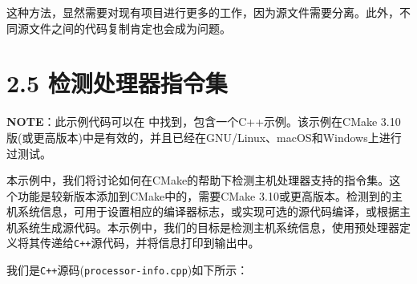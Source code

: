 这种方法，显然需要对现有项目进行更多的工作，因为源文件需要分离。此外，不同源文件之间的代码复制肯定也会成为问题。


\section{2.5 检测处理器指令集}

\begin{myInfoBox}
\textbf{NOTE}：此示例代码可以在  中找到，包含一个C++示例。该示例在CMake 3.10版(或更高版本)中是有效的，并且已经在GNU/Linux、macOS和Windows上进行过测试。
\end{myInfoBox}

本示例中，我们将讨论如何在CMake的帮助下检测主机处理器支持的指令集。这个功能是较新版本添加到CMake中的，需要CMake 3.10或更高版本。检测到的主机系统信息，可用于设置相应的编译器标志，或实现可选的源代码编译，或根据主机系统生成源代码。本示例中，我们的目标是检测主机系统信息，使用预处理器定义将其传递给\texttt{C++}源代码，并将信息打印到输出中。


我们是\texttt{C++}源码(\texttt{processor-info.cpp})如下所示：

